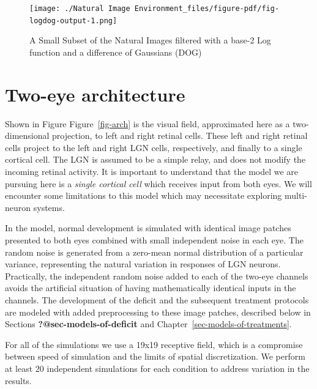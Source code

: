 \documentclass[
  letterpaper,
  number]{elsarticle}
\begin{document}
\begin{figure}[H]

{\centering \texttt{[image: ./Natural Image Environment\_files/figure-pdf/fig-logdog-output-1.png]}

}

\caption{\label{fig-logdog}A Small Subset of the Natural Images filtered
with a base-2 Log function and a difference of Gaussians (DOG)}

\end{figure}

\hypertarget{two-eye-architecture}{%
\section{Two-eye architecture}\label{two-eye-architecture}}

Shown in Figure Figure~\ref{fig-arch} is the visual field, approximated
here as a two-dimensional projection, to left and right retinal cells.
These left and right retinal cells project to the left and right LGN
cells, respectively, and finally to a single cortical cell. The LGN is
assumed to be a simple relay, and does not modify the incoming retinal
activity. It is important to understand that the model we are pursuing
here is a \emph{single cortical cell} which receives input from both
eyes. We will encounter some limitations to this model which may
necessitate exploring multi-neuron systems.

In the model, normal development is simulated with identical image
patches presented to both eyes combined with small independent noise in
each eye. The random noise is generated from a zero-mean normal
distribution of a particular variance, representing the natural
variation in responses of LGN neurons. Practically, the independent
random noise added to each of the two-eye channels avoids the artificial
situation of having mathematically identical inputs in the channels. The
development of the deficit and the subsequent treatment protocols are
modeled with added preprocessing to these image patches, described below
in Sections \textbf{?@sec-models-of-deficit} and
Chapter~\ref{sec-models-of-treatments}.

For all of the simulations we use a 19x19 receptive field, which is a
compromise between speed of simulation and the limits of spatial
discretization. We perform at least 20 independent simulations for each
condition to address variation in the results.
\end{document}
